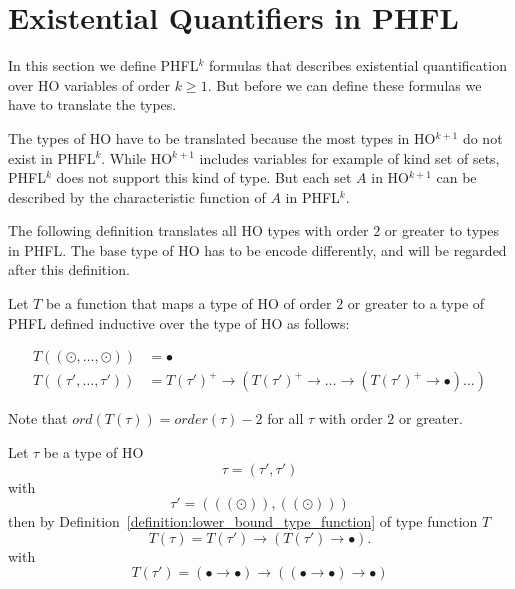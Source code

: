 

\section{Existential Quantifiers in PHFL}\label{sec:existential_quantifiers_in_phfl}

In this section we define PHFL$^{k}$ formulas that describes existential quantification over HO variables of order $k
\geq 1$. But before we can define these formulas we have to translate the types.

The types of HO have to be translated because the most types in HO$^{k + 1}$ do not exist in PHFL$^k$. While HO$^{k +
1}$ includes variables for example of kind set of sets, PHFL$^k$ does not support this kind of type.
But each set $A$ in HO$^{k+1}$ can be described by the characteristic function of $A$ in PHFL$^k$.

The following definition translates all HO types with order $2$ or greater to types in PHFL. The base type of HO
has to be encode differently, and will be regarded after this definition.

\begin{definition}
    \label{definition:lower_bound_type_function}
    Let $T$ be a function that maps a type of HO of order $2$ or greater to a type of PHFL defined inductive over the
    type of HO as follows:

    \begin{align*}
        T((\odot, \dots, \odot)) &= \bullet\\
        T((\tau', \dots, \tau')) &= T(\tau')^+ \rightarrow (T(\tau')^+ \rightarrow \dots \rightarrow (T(\tau')^+
        \rightarrow \bullet) \dots )
    \end{align*}
\end{definition}

Note that $ord(T(\tau)) = order(\tau) - 2$ for all $\tau$ with order $2$ or greater.

\begin{example}
    Let $\tau$ be a type of HO
    \[\tau = (\tau', \tau')\]
    with
    \[\tau' = (((\odot)), ((\odot)))\]
    then by Definition~\ref{definition:lower_bound_type_function} of type function $T$
    \[T(\tau) = T(\tau') \rightarrow (T(\tau') \rightarrow \bullet).\]
    with
    \[T(\tau') = (\bullet \rightarrow \bullet) \rightarrow ((\bullet \rightarrow \bullet) \rightarrow \bullet)\]
\end{example}

